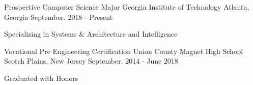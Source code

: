 \begin{cventries}

\iffalse
\cventry
    {Prospective Electrical Engineering and Computer Science Major}
    {Rutgers University}
    {New Brunswick, New Jersey}
    {September. 2018 - Present}
    {
      \begin{cvitems}
        \item {Honors Student in the Engineering Honors Academy}
      \end{cvitems}
    }
\fi
    
\cventry
    {Prospective Computer Science Major}
    {Georgia Institute of Technology}
    {Atlanta, Georgia}
    {September. 2018 - Present}
    {
      \begin{cvitems}
        \item {Specializing in Systems \& Architecture and Intelligence}
      \end{cvitems}
    }

\vspace{-3mm}

  \cventry
    {Vocational Pre Engineering Certification}
    {Union County Magnet High School}
    {Scotch Plains, New Jersey}
    {September. 2014 - June 2018}
    {
      \begin{cvitems}
        \item {Graduated with Honors}
      \end{cvitems}
    }

\vspace{-3mm}


\end{cventries}
